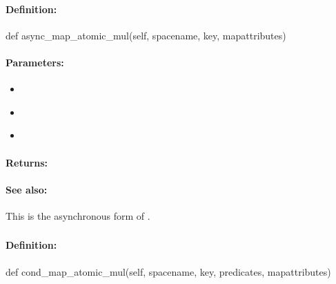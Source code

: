 \paragraph{Definition:}
\begin{pythoncode}
def async_map_atomic_mul(self, spacename, key, mapattributes)
\end{pythoncode}

\paragraph{Parameters:}
\begin{itemize}[noitemsep]
\item {}\\

\item {}\\

\item {}\\

\end{itemize}

\paragraph{Returns:}


\paragraph{See also:}  This is the asynchronous form of .

\pagebreak
\subsubsection{}
\label{api:python:cond_map_atomic_mul}


\paragraph{Definition:}
\begin{pythoncode}
def cond_map_atomic_mul(self, spacename, key, predicates, mapattributes)
\end{pythoncode}

